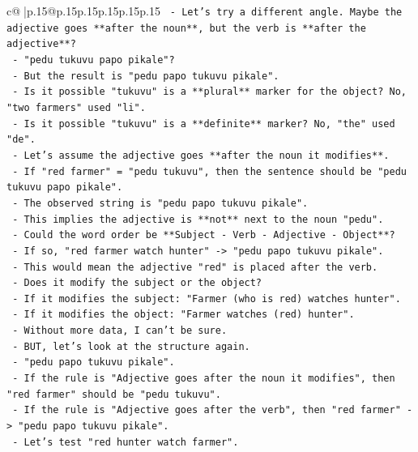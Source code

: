\documentclass{article}
\begin{document}
{\begin{supertabular}{c@{$\;$}|p{.15\linewidth}@{}p{.15\linewidth}p{.15\linewidth}p{.15\linewidth}p{.15\linewidth}p{.15\linewidth}}
{{{\texttt{       {-} Let's try a different angle. Maybe the adjective goes **after the noun**, but the verb is **after the adjective**?} \\
\texttt{         {-} "pedu tukuvu papo pikale"?} \\
\texttt{         {-} But the result is "pedu papo tukuvu pikale".} \\
\texttt{       {-} Is it possible "tukuvu" is a **plural** marker for the object? No, "two farmers" used "li".} \\
\texttt{       {-} Is it possible "tukuvu" is a **definite** marker? No, "the" used "de".} \\
\texttt{       {-} Let's assume the adjective goes **after the noun it modifies**.} \\
\texttt{         {-} If "red farmer" = "pedu tukuvu", then the sentence should be "pedu tukuvu papo pikale".} \\
\texttt{         {-} The observed string is "pedu papo tukuvu pikale".} \\
\texttt{         {-} This implies the adjective is **not** next to the noun "pedu".} \\
\texttt{         {-} Could the word order be **Subject {-} Verb {-} Adjective {-} Object**?} \\
\texttt{           {-} If so, "red farmer watch hunter" {-}> "pedu papo tukuvu pikale".} \\
\texttt{           {-} This would mean the adjective "red" is placed after the verb.} \\
\texttt{           {-} Does it modify the subject or the object?} \\
\texttt{           {-} If it modifies the subject: "Farmer (who is red) watches hunter".} \\
\texttt{           {-} If it modifies the object: "Farmer watches (red) hunter".} \\
\texttt{           {-} Without more data, I can't be sure.} \\
\texttt{           {-} BUT, let's look at the structure again.} \\
\texttt{           {-} "pedu papo tukuvu pikale".} \\
\texttt{           {-} If the rule is "Adjective goes after the noun it modifies", then "red farmer" should be "pedu tukuvu".} \\
\texttt{           {-} If the rule is "Adjective goes after the verb", then "red farmer" {-}> "pedu papo tukuvu pikale".} \\
\texttt{           {-} Let's test "red hunter watch farmer".} \\
}}}
\end{supertabular}}
\end{document}
